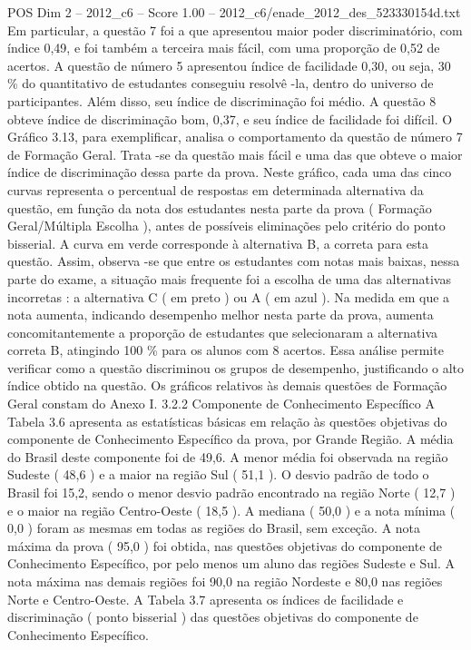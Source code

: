 \begin{textsample}{POS Dim 2 – 2012\_c6 – Score 1.00 – 2012\_c6/enade\_2012\_des\_523330154d.txt}
Em particular, a questão 7 foi a que apresentou maior poder discriminatório, com índice 0,49, e foi também a terceira mais fácil, com uma proporção de 0,52 de acertos.
A questão de número 5 apresentou índice de facilidade 0,30, ou seja, 30 \% do quantitativo de estudantes conseguiu resolvê -la, dentro do universo de participantes.
Além disso, seu índice de discriminação foi médio.
A questão 8 obteve índice de discriminação bom, 0,37, e seu índice de facilidade foi difícil.
O Gráfico 3.13, para exemplificar, analisa o comportamento da questão de número 7 de Formação Geral.
Trata -se da questão mais fácil e uma das que obteve o maior índice de discriminação dessa parte da prova.
Neste gráfico, cada uma das cinco curvas representa o percentual de respostas em determinada alternativa da questão, em função da nota dos estudantes nesta parte da prova ( Formação Geral/Múltipla Escolha ), antes de possíveis eliminações pelo critério do ponto bisserial.
A curva em verde corresponde à alternativa B, a correta para esta questão.
Assim, observa -se que entre os estudantes com notas mais baixas, nessa parte do exame, a situação mais frequente foi a escolha de uma das alternativas incorretas : a alternativa C ( em preto ) ou A ( em azul ).
Na medida em que a nota aumenta, indicando desempenho melhor nesta parte da prova, aumenta concomitantemente a proporção de estudantes que selecionaram a alternativa correta B, atingindo 100 \% para os alunos com 8 acertos.
Essa análise permite verificar como a questão discriminou os grupos de desempenho, justificando o alto índice obtido na questão.
Os gráficos relativos às demais questões de Formação Geral constam do Anexo I. 3.2.2 Componente de Conhecimento Específico A Tabela 3.6 apresenta as estatísticas básicas em relação às questões objetivas do componente de Conhecimento Específico da prova, por Grande Região.
A média do Brasil deste componente foi de 49,6.
A menor média foi observada na região Sudeste ( 48,6 ) e a maior na região Sul ( 51,1 ).
O desvio padrão de todo o Brasil foi 15,2, sendo o menor desvio padrão encontrado na região Norte ( 12,7 ) e o maior na região Centro-Oeste ( 18,5 ).
A mediana ( 50,0 ) e a nota mínima ( 0,0 ) foram as mesmas em todas as regiões do Brasil, sem exceção.
A nota máxima da prova ( 95,0 ) foi obtida, nas questões objetivas do componente de Conhecimento Específico, por pelo menos um aluno das regiões Sudeste e Sul.
A nota máxima nas demais regiões foi 90,0 na região Nordeste e 80,0 nas regiões Norte e Centro-Oeste.
A Tabela 3.7 apresenta os índices de facilidade e discriminação ( ponto bisserial ) das questões objetivas do componente de Conhecimento Específico.

\end{textsample}
